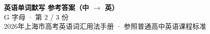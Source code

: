 \documentclass[10pt,a4paper]{article}
\begin{document}
\pagestyle{plain}

\begin{center}
{\LARGE\bfseries 英语单词默写 \quad 参考答案（中 $\to$ 英）}\\[0.22em]
{\large G 字母 · 第 2 / 3 份}\\[0.18em]
{\small 2026年上海市高考英语词汇用法手册 · 参照普通高中英语课程标准}
\end{center}

\vspace{0.2em}
\noindent{\color{rulegray}\rule{\textwidth}{0.8pt}}

\vspace{0.35em}

\vspace{0.25em}
\renewcommand{\arraystretch}{1.32}
\end{document}
